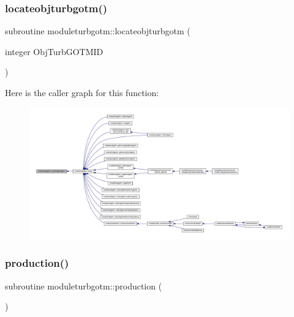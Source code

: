 \subsubsection{\texorpdfstring{locateobjturbgotm()}{locateobjturbgotm()}}
{\footnotesize\ttfamily subroutine moduleturbgotm\+::locateobjturbgotm (\begin{DoxyParamCaption}\item[{integer}]{Obj\+Turb\+G\+O\+T\+M\+ID }\end{DoxyParamCaption})\hspace{0.3cm}{\ttfamily [private]}}

Here is the caller graph for this function\+:\nopagebreak
\begin{figure}[H]
\begin{center}
\leavevmode
\includegraphics[width=350pt]{namespacemoduleturbgotm_a2445ccc2c59cf2ae892fd78dda123a3d_icgraph}
\end{center}
\end{figure}
\mbox{\label{namespacemoduleturbgotm_a67c6b885be20c57ed033df6706d9adab}} 
\subsubsection{\texorpdfstring{production()}{production()}}
{\footnotesize\ttfamily subroutine moduleturbgotm\+::production (\begin{DoxyParamCaption}{ }\end{DoxyParamCaption})\hspace{0.3cm}{\ttfamily [private]}}

